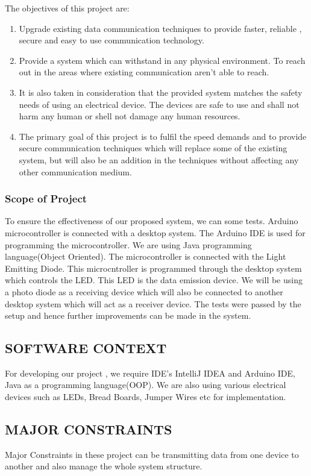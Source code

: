 \documentclass[12pt,a4paper]
{article}
\numberwithin{table}{section}
\begin{document}
{{{{ The objectives of this project are:
 \begin{enumerate}
\item Upgrade existing data communication techniques to provide faster, reliable , secure and easy to use communication technology.

\item Provide a system which can withstand in any physical environment. To reach out in the areas where existing communication aren't able to reach.
\item It is also taken in consideration that the provided system matches the safety needs of using an electrical device. The devices are safe to use and shall not harm any human or shell not damage any human resources.

\item The primary goal of this project is to fulfil the speed demands and to provide secure communication techniques which  will replace some of the existing system, but will also be an addition in the techniques without affecting any other communication medium. \\
\end{enumerate}

\subsubsection{Scope of Project}
To ensure the effectiveness of our proposed system, we can some tests. Arduino microcontroller is connected with a 
desktop system. The Arduino IDE is used for programming the microcontroller. We are using Java programming language(Object Oriented).
	The microcontroller is connected with the Light Emitting Diode. This microcntroller is programmed through the desktop system which controls the LED. This LED is the data emission device. We will be using a photo diode as a receiving device which will also be connected to another desktop system  which will act as a receiver device. The tests were passed by the setup and hence further improvements can be made  in the system.  
\subsection{SOFTWARE CONTEXT}
For developing our project , we require IDE's IntelliJ IDEA and Arduino IDE, Java as a programming language(OOP). We are also using various electrical devices such as LEDs, Bread Boards, Jumper Wires etc for implementation.

\subsection{MAJOR CONSTRAINTS}
Major Constraints in these project can be transmitting data from one device to another and also manage the whole system structure.



}}}}
\end{document}
